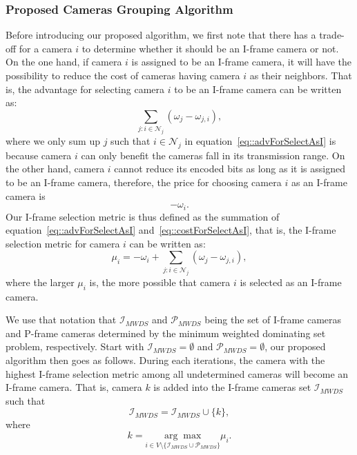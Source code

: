 \subsubsection{Proposed Cameras Grouping Algorithm}
Before introducing our proposed algorithm, we first note that there has a trade-off for a camera $i$ to determine whether it should be an I-frame camera or not.
On the one hand, if camera $i$ is assigned to be an I-frame camera, it will have the possibility to reduce the cost of cameras having camera $i$ as their neighbors.
That is, the advantage for selecting camera $i$ to be an I-frame camera can be written as:
\begin{equation}
\sum_{j:i \in \mathcal{N}_j} \left( \omega_j - \omega_{j,i} \right),
\label{eq::advForSelectAsI}
\end{equation}
where we only sum up $j$ such that $i \in \mathcal{N}_j$ in equation~\eqref{eq::advForSelectAsI} is because camera $i$ can only benefit the cameras fall in its transmission range.
On the other hand, camera $i$ cannot reduce its encoded bits as long as it is assigned to be an I-frame camera, therefore, the price for choosing camera $i$ as an I-frame camera is
\begin{equation}
- \omega_i.
\label{eq::costForSelectAsI}
\end{equation}
Our I-frame selection metric is thus defined as the summation of equation~\eqref{eq::advForSelectAsI} and~\eqref{eq::costForSelectAsI}, that is, the I-frame selection metric for camera $i$ can be written as:
\begin{equation}
\mu_i = - \omega_i + \sum_{j:i \in \mathcal{N}_j} \left( \omega_j - \omega_{j,i} \right),
\label{eq::IFrameSelectionMetric}
\end{equation}
where the larger $\mu_i$ is, the more possible that camera $i$ is selected as an I-frame camera.

We use that notation that $\mathcal{I}_{MWDS}$ and $\mathcal{P}_{MWDS}$ being the set of I-frame cameras and P-frame cameras determined by the minimum weighted dominating set problem, respectively.
Start with $\mathcal{I}_{MWDS} = \emptyset$ and $\mathcal{P}_{MWDS} = \emptyset$, our proposed algorithm then goes as follows.
During each iterations, the camera with the highest I-frame selection metric among all undetermined cameras will become an I-frame camera.
That is, camera $k$ is added into the I-frame cameras set $\mathcal{I}_{MWDS}$ such that
\begin{equation}
\mathcal{I}_{MWDS} = \mathcal{I}_{MWDS} \cup \{ k \},
\label{eq::updateICamsSet}
\end{equation}
where
\begin{equation}
k = \underset{i \in V \setminus \{ \mathcal{I}_{MWDS} \cup \mathcal{P}_{MWDS} \} }{\arg \max} \mu_i.
\end{equation}

